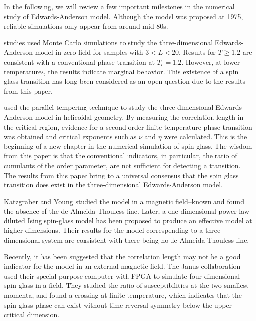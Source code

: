 In the following, we will review a few important milestones in the numerical study of
Edwards-Anderson model. Although the model was proposed at 1975, reliable simulations
only appear from around mid-80s.

\citet{Bhatt-Young-1985} studies used Monte Carlo simulations to study the three-dimensional
Edwards-Anderson model in zero field for samples with $3<L<20$. Results for 
$T\ge1.2$ are consistent with a conventional phase transition at $T_c=1.2$.
However, at lower temperatures, the results indicate marginal behavior. This existence
of a spin glass transition has long been considered as an open question due to the
results from this paper. 

\citet{PhysRevB.62.14237} used the parallel tempering technique to study the three-dimensional
Edwards-Anderson model in helicoidal geometry. By measuring the correlation length
in the critical region,  evidence for a second order finite-temperature phase 
transition was obtained and critical exponents such as $\nu$ and $\eta$ were 
calculated. This is the beginning of a new chapter in the numerical simulation 
of spin glass. The wisdom from this paper is that the conventional indicators,
in particular, the ratio of cumulants of the order parameter, are not sufficient 
for detecting a transition. The results from this paper bring to a universal
consensus that the spin glass transition does exist in the three-dimensional
Edwards-Anderson model.

Katzgraber and Young studied the model in a magnetic field--known and 
found the absence of the de Almeida-Thouless line. Later, a one-dimensional 
power-law diluted Ising spin-glass model has been proposed to produce an
effective model at higher dimensions\cite{Young-Katzgraber2004}. Their results for the model 
corresponding to a three-dimensional system are consistent with there being no 
de Almeida-Thouless line.

Recently, it has been suggested that the correlation length may not be a 
good indicator for the model in an external magnetic field.
The Janus collaboration \cite{Banos-2012,TheJanusCollaboration:2012:JFS:2322156.2322158} 
used their special purpose computer with FPGA to simulate
four-dimensional spin glass in a field. They studied the ratio of susceptibilities 
at the two smallest momenta, and found a crossing at finite temperature, which 
indicates that the spin glass phase can exist without time-reversal symmetry
below the upper critical dimension.


